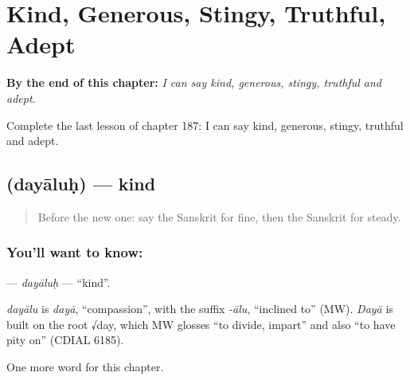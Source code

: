 
\chapter{Kind, Generous, Stingy, Truthful, Adept}
\label{ch:sa-kind-generous-stingy-truthful-adept}

\begin{chapteropening}
\textbf{By the end of this chapter:} \emph{I can say kind, generous, stingy, truthful and adept.}

Complete the last lesson of chapter 187: I can say kind, generous, stingy, truthful and adept.
\end{chapteropening}

\section[\texorpdfstring{\sk{दयालुः} (dayāluḥ)}{दयालुः (dayāluḥ)}]{ (dayāluḥ) — kind}

\label{lesson:SA-C187-dayaluh}



\begin{quote}
Before the new one: say the Sanskrit for fine, then the Sanskrit for steady.
\end{quote}

\subsection*{You'll want to know: }
\textbf{} — \emph{dayāluḥ} — \textquotedblleft{}kind\textquotedblright{}.

\begin{cousinweb}
\emph{dayālu} is \emph{dayā}, \textquotedblleft{}compassion\textquotedblright{}, with the suffix \emph{-ālu}, \textquotedblleft{}inclined to\textquotedblright{} (MW). \emph{Dayā} is built on the root √day, which MW glosses \textquotedblleft{}to divide, impart\textquotedblright{} and also \textquotedblleft{}to have pity on\textquotedblright{} (CDIAL 6185).
\end{cousinweb}

\begin{grammarlens}[title={What you've built}]
One more word for this chapter.
\end{grammarlens}

